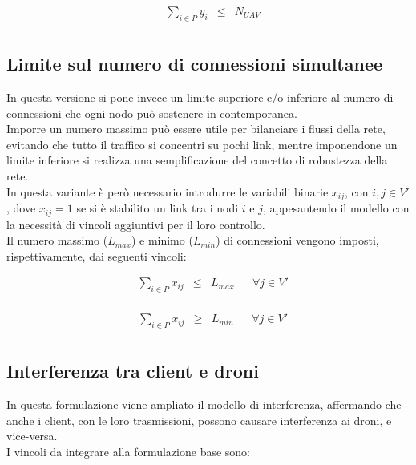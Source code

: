 \begin{equation*} \label{eq:-4_4}
	\begin{array}{rrclcl}
		& \displaystyle \sum_{i \in P} y_{i} & \leq & N_{UAV}\\
	\end{array}
\end{equation*} 
 
\subsection{Limite sul numero di connessioni simultanee}
In questa versione si pone invece un limite superiore e/o inferiore al numero di connessioni che ogni nodo può sostenere in contemporanea. \\
Imporre un numero massimo può essere utile per bilanciare i flussi della rete, evitando che tutto il traffico si concentri su pochi link, mentre imponendone  un limite inferiore si realizza una semplificazione del concetto di robustezza della rete. \\
In questa variante è però necessario introdurre le variabili binarie $x_{ij}$, con $i,j \in V'$, dove $x_{ij} = 1$ se si è stabilito un link tra i nodi $i$ e $j$, appesantendo il modello con la necessità di vincoli aggiuntivi per il loro controllo. \\
Il numero massimo ($L_{max}$) e minimo ($L_{min}$) di connessioni vengono imposti, rispettivamente, dai seguenti vincoli:

\begin{equation*} \label{eq:max}
	\begin{array}{rrclcl}
		& \displaystyle \sum_{i \in P} x_{ij} & \leq & L_{max} && \forall j \in V' \\
	\end{array}
\end{equation*} 

\begin{equation*} \label{eq:min}
\begin{array}{rrclcl}
	& \displaystyle \sum_{i \in P} x_{ij} & \geq & L_{min} && \forall j \in V' \\
\end{array}
\end{equation*} 

\subsection{Interferenza tra client e droni}
In questa formulazione viene ampliato il modello di interferenza, affermando che anche i client, con le loro trasmissioni, possono causare interferenza ai droni, e vice-versa. \\
I vincoli da integrare alla formulazione base sono:

